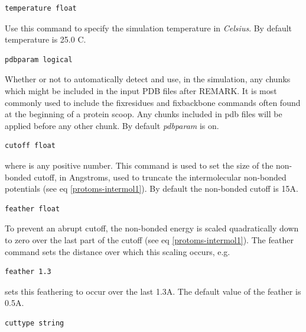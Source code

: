 \documentclass[letterpaper,10pt,english]{sphinxmanual}
\begin{document}
\begin{Verbatim}[commandchars=\\\{\}]
temperature float
\end{Verbatim}

Use this command to specify the simulation temperature in \emph{Celsius}. By default temperature is 25.0 C.

\begin{Verbatim}[commandchars=\\\{\}]
pdbparam logical
\end{Verbatim}

Whether or not to automatically detect and use, in the simulation, any chunks which might be included in the input PDB files after REMARK. It is most commonly used to include the fixresidues and fixbackbone commands often found at the beginning of a protein scoop. Any chunks included in pdb files will be applied before any other chunk. By default \emph{pdbparam} is on.

\begin{Verbatim}[commandchars=\\\{\}]
cutoff float
\end{Verbatim}

where  is any positive number. This command is used to set the size of the non-bonded cutoff, in Angstroms, used to truncate the intermolecular non-bonded potentials (see eq \eqref{protoms-intermol1}). By default the non-bonded cutoff is 15A.

\begin{Verbatim}[commandchars=\\\{\}]
feather float
\end{Verbatim}

To prevent an abrupt cutoff, the non-bonded energy is scaled quadratically down to zero over the last part of the cutoff (see eq \eqref{protoms-intermol1}). The feather command sets the distance over which this scaling occurs, e.g.

\begin{Verbatim}[commandchars=\\\{\}]
feather 1.3
\end{Verbatim}

sets this feathering to occur over the last 1.3A. The default value of the feather is 0.5A.

\begin{Verbatim}[commandchars=\\\{\}]
cuttype string
\end{Verbatim}
\end{document}
